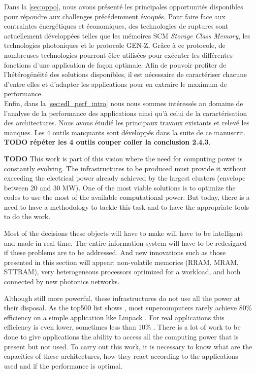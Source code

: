     
    Dans la \autoref{sec:oppo}, nous avons présenté les principales opportunités disponibles pour répondre aux challenges précédemment évoqués. Pour faire face aux contraintes énergétiques et économiques, des technologies de ruptures sont actuellement développées telles que les mémoires SCM \textit{Storage Class Memory}, les technologies photoniques et le protocole GEN-Z. Grâce à ce protocole, de nombreuses technologies pourront être utilisées pour exécuter les différentes fonctions d’une application de façon optimale. Afin de pouvoir profiter de l'hétérogénéité des solutions disponibles, il est nécessaire de caractériser chacune d'entre elles et d'adapter les applications pour en extraire le maximum de performance.\\
    
    Enfin, dans la \autoref{sec:edl_perf_intro} nous nous sommes intéressés au domaine de l'analyse de la performance des applications ainsi qu'à celui de la caractérisation des architectures. Nous avons étudié les principaux travaux existants et relevé les manques. Les 4 outils manquants sont développés dans la suite de ce manuscrit.
    \textbf{TODO répéter les 4 outils couper coller la conclusion 2.4.3}.

\iffalse

    
    \textbf{TODO}
    This work is part of this vision where the need for computing power is constantly evolving. The infrastructures to be produced must provide it without exceeding the electrical power already achieved by the largest clusters (envelope between 20 and 30 MW). One of the most viable solutions is to optimize the codes to use the most of the available computational power. But today, there is a need to have a methodology to tackle this task and to have the appropriate tools to do the work.
    
    Most of the decisions these objects will have to make will have to be intelligent and made in real time. The entire information system will have to be redesigned if these problems are to be addressed. And new innovations such as those presented in this section will appear: non-volatile memories (RRAM, MRAM, STTRAM), very heterogeneous processors optimized for a workload, and both connected by new photonics networks.
    
    
    Although still more powerful, these infrastructures do not use all the power at their disposal. As the top500 list shows \cite{Top500}, most supercomputers rarely achieve 80\% efficiency on a simple application like Linpack \cite{Dongarra2003}. For real applications this efficiency is even lower, sometimes less than 10\% \cite{Oliker2005}. There is a lot of work to be done to give applications the ability to access all the computing power that is present but not used. To carry out this work, it is necessary to know what are the capacities of these architectures, how they react according to the applications used and if the performance is optimal.
    
